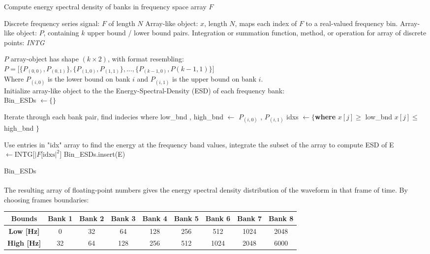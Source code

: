 \documentclass[12pt,letterpaper]{article}
\begin{document}
\begin{algorithm}
\label{ESD}
\caption{Compute energy spectral density of banks in frequency space array $F$}
\begin{algorithmic}
\REQUIRE Discrete frequency series signal: $F$ of length $N$
\REQUIRE Array-like object: $x$, length $N$, maps each index of $F$ to a real-valued frequency bin.
\REQUIRE Array-like object: $P$, containing $k$ upper bound / lower bound pairs.
\REQUIRE Integration or summation function, method, or operation for array of discrete points: \textit{INTG}

\ENSURE $P$ array-object has shape $(k \times 2)$, with format resembling: \\
$P = \Big[ \{P_{(0,0)},P_{(0,1)}\} , \{P_{(1,0)},P_{(1 ,1)}\} ,  ... , \{P_{(k-1,0)},P{(k-1,1)}\} \Big]$\\
Where $P_{(i,0)}$ is the lower bound on bank $i$ and $P_{(i,1)}$ is the upper bound on bank $i$.\\
Initialize array-like object to the the Energy-Spectral-Density (ESD) of each frequency bank: \\
Bin\_ESDs $\leftarrow \{\}$

	\item Iterate through each bank pair, find indecies where  
	\STATE low\_bnd , high\_bnd $\leftarrow$ $P_{(i,0)}$ , $P_{(i,1)}$
	\STATE idxs $\leftarrow \{ $\textbf{where} $x[j] \geq$ low\_bnd \AND $x[j] \leq$ high\_bnd $\}$
	\item Use entries in "idx" array to find the energy at the frequency band values, integrate the subset of the array to compute ESD of 
	\STATE E $\leftarrow \text{INTG}\big[ |F[\text{idxs}|^2 \Big]$
	\STATE Bin\_ESDs.insert(E)
\ENDFOR

\RETURN Bin\_ESDs
\end{algorithmic}
\end{algorithm}

\paragraph*{}The resulting array of floating-point numbers gives the energy spectral density distribution of the waveform in that frame of time. By choosing frames boundaries:

\begin{center}
\begin{tabular}{|c|c|c|c|c|c|c|c|c|}
\hline
\textbf{Bounds} & 	\textbf{Bank 1} & \textbf{Bank 2} & \textbf{Bank 3} & \textbf{Bank 4} & 
					\textbf{Bank 5} & \textbf{Bank 6} & \textbf{Bank 7} & \textbf{Bank 8}  \\ \hline
\textbf{Low [Hz]}	& 0		& 32	& 64 & 128 & 256 & 512 & 1024 & 2048  		\\ 	\hline
\textbf{High [Hz]}	& 32	& 64	& 128 & 256 & 512 & 1024 &  2048 & 6000 	\\	\hline
\end{tabular}
\end{center}
\end{document}
